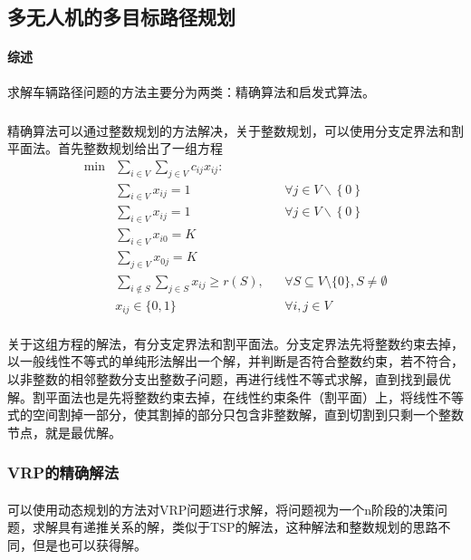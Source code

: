 \documentclass[UTF8,a4paper]{ctexart}
\begin{document}
\subsection{多无人机的多目标路径规划}\label{sec:vrp}
\paragraph{综述}求解车辆路径问题的方法主要分为两类：精确算法和启发式算法。
\subparagraph{}精确算法可以通过整数规划的方法解决，关于整数规划，可以使用分支定界法和割平面法。首先整数规划给出了一组方程
\begin{align*}
    \min & \sum_{i\in V}\sum_{j \in V}c_{ij}x_{ij}\colon   &  &                                                     \\
         & \sum _{i\in V}x_{ij}=1                          &  & \forall j\in V\backslash \left\{0\right\}           \\
         & \sum _{i\in V}x_{ij}=1                          &  & \forall j\in V\backslash \left\{0\right\}           \\
         & \sum _{i\in V}x_{i0}=K                          &  &                                                     \\
         & \sum _{j\in V}x_{0j}=K                          &  &                                                     \\
         & \sum _{i\notin S}\sum _{j\in S}x_{ij}\geq r(S), &  & \forall S\subseteq V\setminus \{0\},S\neq \emptyset \\
         & x_{ij}\in \{0,1\}                               &  & \forall i,j\in V
\end{align*}
\paragraph{}关于这组方程的解法，有分支定界法和割平面法。分支定界法先将整数约束去掉，以一般线性不等式的单纯形法解出一个解，并判断是否符合整数约束，若不符合，以非整数的相邻整数分支出整数子问题，再进行线性不等式求解，直到找到最优解。割平面法也是先将整数约束去掉，在线性约束条件（割平面）上，将线性不等式的空间割掉一部分，使其割掉的部分只包含非整数解，直到切割到只剩一个整数节点，就是最优解。
\subsubsection{VRP的精确解法~\cite{qureshi2010exact}}
\paragraph{}可以使用动态规划的方法对VRP问题进行求解，将问题视为一个n阶段的决策问题，求解具有递推关系的解，类似于TSP的解法，这种解法和整数规划的思路不同，但是也可以获得解。
\end{document}
